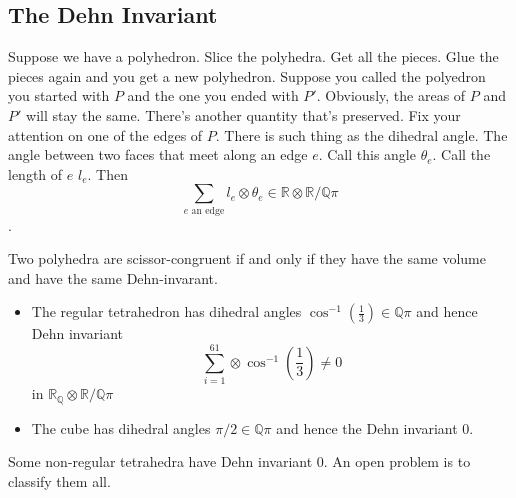 \documentclass{article}
\newcommand{\Q}{\mathbb{Q}}
\newcommand{\R}{\mathbb{R}}
\begin{document}
\subsection{The Dehn Invariant}
Suppose we have a polyhedron. Slice the polyhedra. Get all the pieces. Glue the pieces again and you get a new polyhedron. Suppose you called the polyedron you started with $P$ and the one you ended with $P'$. Obviously, the areas of $P$ and $P'$ will stay the same. There's another quantity that's preserved. Fix your attention on one of the edges of $P$. There is such thing as the dihedral angle. The angle between two faces that meet along an edge $e$. Call this angle $\theta_e$. Call the length of $e$ $l_e$. Then $$\sum_{e\textrm{ an edge}}l_e\otimes \theta_e\in\R\otimes \R/\Q\pi$$.
\begin{theorem}
Two polyhedra are scissor-congruent if and only if they have the same volume and have the same Dehn-invarant.
\end{theorem}
\begin{itemize}
    \item The regular tetrahedron has dihedral angles $\cos^{-1}(\frac{1}{3})\in\Q\pi$ and hence Dehn invariant
    $$\sum_{i=1}^61\otimes\cos^{-1}(\frac{1}{3})\neq 0$$ in $\R_\Q\otimes \R/\Q\pi$
    \item The cube has dihedral angles $\pi/2\in\Q\pi$ and hence the Dehn invariant 0.
\end{itemize}
Some non-regular tetrahedra have Dehn invariant 0. An open problem is to classify them all.
\end{document}
